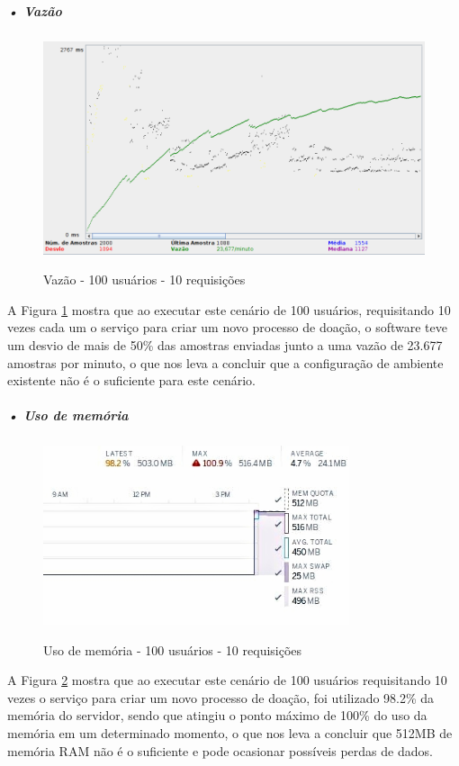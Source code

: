 \documentclass[portuguese,oneside]{tcc}
\begin{document}
\subparagraph{• Vazão}
\begin{figure}[htp]
\centering
\caption{Vazão - 100 usuários - 10 requisições}
\includegraphics[width=15cm]{100-10-throughput}
\label{fig:throughput-100-10}
\end{figure}

A Figura \ref{fig:throughput-100-10} mostra que ao executar este cenário de 100 usuários, requisitando 10 vezes cada um o serviço para criar um novo processo de doação, o software teve um desvio de mais de 50\% das amostras enviadas junto a uma vazão de 23.677 amostras por minuto, o que nos leva a concluir que a configuração de ambiente existente não é o suficiente para este cenário.

\newpage

\subparagraph{• Uso de memória}
\begin{figure}[htp]
\centering
\caption{Uso de memória - 100 usuários - 10 requisições}
\includegraphics[width=9cm]{100-10-memory}
\label{fig:uso-de-memoria-100-10}
\end{figure}
A Figura \ref{fig:uso-de-memoria-100-10} mostra que ao executar este cenário de 100 usuários requisitando 10 vezes o serviço para criar um novo processo de doação, foi utilizado 98.2\% da memória do servidor, sendo que atingiu o ponto máximo de 100\% do uso da memória em um determinado momento, o que nos leva a concluir que 512MB de memória RAM não é o suficiente e pode ocasionar possíveis perdas de dados.
\end{document}
